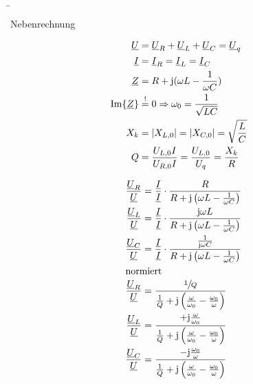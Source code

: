 \b{%
\begin{frame}{Nebenrechnung}
\begin{minipage}{0.3\textwidth}%
    \begin{align*}
        \underline{U} &= \underline{U}_R + \underline{U}_L + \underline{U}_C = \underline{U}_q\\
        \underline{I} &= \underline{I}_R = \underline{I}_L = \underline{I}_C \\
        \underline{Z} &= R + \mathrm{j}(\omega L - \frac{1}{\omega C}) \\
        \mathllap{\Im\{\underline{Z}\}} &\overset{!}{=} 0 \Rightarrow \omega_0 =\frac{1}{\sqrt{LC}}\\
        X_k &= |X_{L,0}| = |X_{C,0}| =  \mathrlap{\sqrt{\frac{L}{C}}}\\
        Q &= \frac{U_{L,0}I}{U_{R,0} I} = \frac{U_{L,0}}{U_q} = \frac{X_k}{R}
    \end{align*}
\end{minipage}\hfill%
\begin{minipage}{0.65\textwidth}\centering
    \begin{align*}
        \frac{\underline{U}_R}{\underline{U}} &= \frac{\underline{I}}{\underline{I}}
            \cdot \frac{R}{R+\mathrm{j}\left(\omega L-\frac{1}{\omega C}\right)}\\
        \frac{\underline{U}_L}{\underline{U}} &= \frac{\underline{I}}{\underline{I}}
            \cdot \frac{\mathrm{j}\omega L}{R+\mathrm{j}\left(\omega L-\frac{1}{\omega C}\right)}\\
        \frac{\underline{U}_C}{\underline{U}} &= \frac{\underline{I}}{\underline{I}}
            \cdot \frac{\frac{1}{\mathrm{j}\omega C}}{R+\mathrm{j}\left(\omega L-\frac{1}{\omega C}\right)}\\
        \intertext{normiert}
        \frac{\underline{U}_R}{\underline{U}} &= 
            \frac{\sfrac{1}{Q}}{\frac{1}{Q}+\mathrm{j}\left(\frac{\omega}{\omega_0}-\frac{\omega_0}{\omega}\right)}\\
        \frac{\underline{U}_L}{\underline{U}} &=
            \frac{+\mathrm{j}\frac{\omega}{\omega_0}}{\frac{1}{Q}+\mathrm{j}\left(\frac{\omega}{\omega_0}-\frac{\omega_0}{\omega}\right)}\\
        \frac{\underline{U}_C}{\underline{U}} &= 
            \frac{-\mathrm{j}\frac{\omega_0}{\omega}}{\frac{1}{Q}+\mathrm{j}\left(\frac{\omega}{\omega_0}-\frac{\omega_0}{\omega}\right)}
    \end{align*}
\end{minipage}
\end{frame}
}

